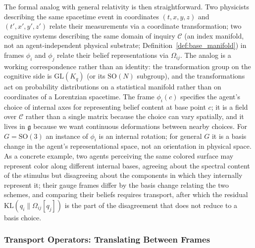 \documentclass[11pt]{article}
\begin{document}
The formal analog with general relativity is then straightforward. Two physicists describing the same spacetime event in coordinates $(t, x, y, z)$ and $(t', x', y', z')$ relate their measurements via a coordinate transformation; two cognitive systems describing the same domain of inquiry $\mathcal{C}$ (an index manifold, not an agent-independent physical substrate; Definition~\ref{def:base_manifold}) in frames $\phi_i$ and $\phi_j$ relate their belief representations via $\Omega_{ij}$. The analog is a working correspondence rather than an identity: the transformation group on the cognitive side is $\mathrm{GL}(K_q)$ (or its $\mathrm{SO}(N)$ subgroup), and the transformations act on probability distributions on a statistical manifold rather than on coordinates of a Lorentzian spacetime. The frame $\phi_i(c)$ specifies the agent's choice of internal axes for representing belief content at base point $c$; it is a field over $\mathcal{C}$ rather than a single matrix because the choice can vary spatially, and it lives in $\mathfrak{g}$ because we want continuous deformations between nearby choices. For $G = \mathrm{SO}(3)$ an instance of $\phi_i$ is an internal rotation; for general $G$ it is a basis change in the agent's representational space, not an orientation in physical space. As a concrete example, two agents perceiving the same colored surface may represent color along different internal bases, agreeing about the spectral content of the stimulus but disagreeing about the components in which they internally represent it; their gauge frames differ by the basis change relating the two schemes, and comparing their beliefs requires transport, after which the residual $\mathrm{KL}(q_i \| \Omega_{ij}[q_j])$ is the part of the disagreement that does not reduce to a basis choice.

\subsubsection{Transport Operators: Translating Between Frames}
\label{sec:transport}
\end{document}

